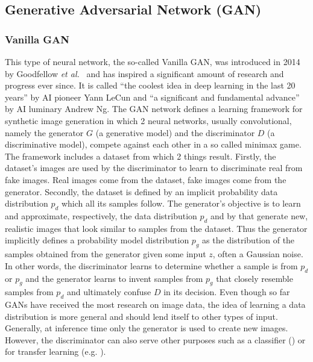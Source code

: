 \documentclass[12pt,a4paper]{article}
\begin{document}
\subsection{Generative Adversarial Network (GAN)}
\subsubsection{Vanilla GAN}
This type of neural network, the so-called Vanilla GAN, was introduced in 2014 by Goodfellow \textit{et al.}~\cite{1406.2661} and has inspired a significant amount of research and progress ever since. It is called ``the coolest idea in deep learning in the last 20 years'' by AI pioneer Yann LeCun and ``a significant and fundamental advance'' by AI luminary Andrew Ng. The GAN network defines a learning framework for synthetic image generation in which 2 neural networks, usually convolutional, namely the generator $G$ (a generative model) and the discriminator $D$ (a discriminative model), compete against each other in a so called minimax game. The framework includes a dataset from which 2 things result. Firstly, the dataset's images are used by the discriminator to learn to discriminate real from fake images. Real images come from the dataset, fake images come from the generator. Secondly, the dataset is defined by an implicit probability data distribution $p_d$ which all its samples follow. The generator's objective is to learn and approximate, respectively, the data distribution $p_d$ and by that generate new, realistic images that look similar to samples from the dataset. Thus the generator implicitly defines a probability model distribution $p_g$ as the distribution of the samples obtained from the generator given some input $z$, often a Gaussian noise. In other words, the discriminator learns to determine whether a sample is from $p_d$ or $p_g$ and the generator learns to invent samples from $p_g$ that closely resemble samples from $p_d$ and ultimately confuse $D$ in its decision. Even though so far GANs have received the most research on image data, the idea of learning a data distribution is more general and should lend itself to other types of input. Generally, at inference time only the generator is used to create new images. However, the discriminator can also serve other purposes such as a classifier (\cite{ImprTechn4TrainGANs}) or for transfer learning (e.g. \cite{SpotArtifacts}).
\end{document}
